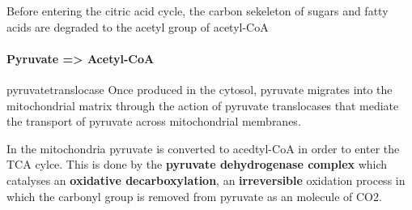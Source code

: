 \documentclass[../main.tex]{subfiles}
\begin{document}
Before entering the citric acid cycle, the carbon sekeleton of sugars and fatty acids are degraded to the acetyl group of acetyl-CoA

\paragraph{Pyruvate => Acetyl-CoA}

\begin{RemarkWithTitel}{\gls{pyruvatetranslocase}}
	Once produced in the cytosol, pyruvate migrates into the mitochondrial matrix through the action of pyruvate translocases that mediate the transport of pyruvate across mitochondrial membranes. 
\end{RemarkWithTitel}

In the mitochondria pyruvate is converted to acedtyl-CoA in order to enter the TCA cylce. This is done by the \textbf{pyruvate dehydrogenase complex} which catalyses an \textbf{oxidative decarboxylation}, an \textbf{irreversible} oxidation process in which the carbonyl group is removed from pyruvate as an molecule of CO2. 
\end{document}
